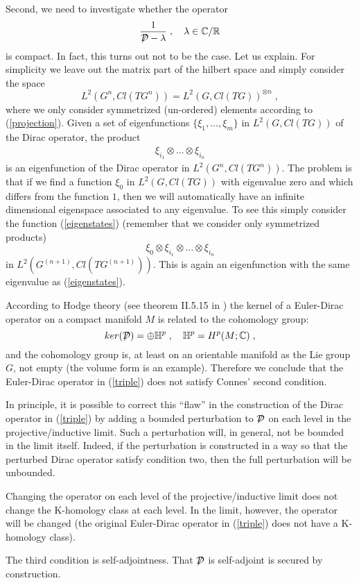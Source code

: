 \documentclass[12pt]{article}
\newcommand{\ba}{\begin{eqnarray}}
\newcommand{\ea}{\end{eqnarray}}
\def\l{\lambda}
\def\cd{{\cal D}}
\newcommand{\bbC}{{\Bbb C}}
\newcommand{\bbH}{{\Bbb H}}
\newcommand{\bbR}{{\Bbb R}}
\begin{document}
Second, we need to investigate
whether the operator 
\[
\frac{1}{\displaystyle{\not} \cd-\l}\;,\quad \l\in\bbC/\bbR
\]
is compact. In fact, this turns out not to be the case. Let us explain. 
For simplicity we leave out the matrix part of the hilbert space and
simply consider the space
\[
L^2(G^n,Cl(TG^n)) = L^2(G,Cl(TG))^{\otimes n}\;,
\]
where we only consider symmetrized (un-ordered) elements according to (\ref{projection}). Given a set of
eigenfunctions $\{\xi_1,\ldots,\xi_m \}$ in $L^2(G,Cl(TG))$ of the Dirac
operator, the product
\ba
\xi_{i_1}\otimes\ldots\otimes\xi_{i_n}
\label{eigenstates}
\ea
is an eigenfunction of the Dirac operator in $L^2(G^n,Cl(TG^n))$. The problem
is that if we find a function $\xi_0$ in $L^2(G,Cl(TG))$ with eigenvalue zero
and which differs from the function $1$,
then we will automatically have an infinite dimensional eigenspace associated
to any eigenvalue. To see this simply consider the function
(\ref{eigenstates}) (remember that we consider only symmetrized products)
\[
\xi_0\otimes\xi_{i_1}\otimes\ldots\otimes\xi_{i_n}
\]
in $L^2(G^{(n+1)},Cl(TG^{(n+1)}))$. This is again an eigenfunction with the same eigenvalue as
(\ref{eigenstates}). 

According to Hodge theory (see theorem II.5.15 in \cite{spingeometri}) the
kernel of a Euler-Dirac operator on a compact manifold $M$ is related to the
cohomology group:
\[
ker(\displaystyle{\not} \cd) = \oplus \bbH^p\;,\quad \bbH^p = H^p(M;\bbC)\;,
\]
and the cohomology group is, at least on an orientable manifold as the
Lie group $G$, not empty (the volume form is an example). Therefore we
conclude that the Euler-Dirac operator in (\ref{triple}) does not satisfy Connes'
second condition.

In principle, it is possible to correct this ``flaw'' in the construction of the Dirac
operator in (\ref{triple}) by adding a bounded perturbation to
$\displaystyle{\not} \cd$ on each level in the projective/inductive
limit. Such a perturbation will, in general, not be bounded in the limit
itself. Indeed, if the perturbation is constructed in a way so that the
perturbed Dirac operator satisfy condition two, then the full perturbation
will be unbounded.

Changing the operator on each level of the projective/inductive limit does not
change the K-homology class at each level. In the limit, however, the operator
will be changed
(the original Euler-Dirac operator in (\ref{triple}) does not have a
K-homology class). 

The third condition is self-adjointness. That $\displaystyle{\not} \cd$ is
self-adjoint is secured by construction.
\end{document}
